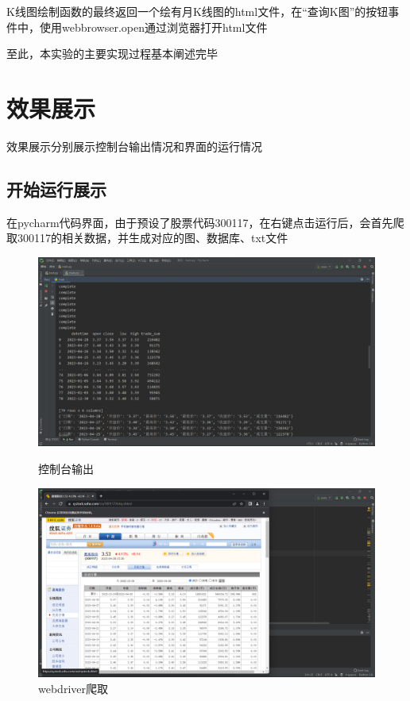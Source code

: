 \documentclass[UTF8,12pt]{article}
\begin{document}
K线图绘制函数的最终返回一个绘有月K线图的html文件，在“查询K图”的按钮事件中，使用webbrowser.open通过浏览器打开html文件

至此，本实验的主要实现过程基本阐述完毕

\section{效果展示}
效果展示分别展示控制台输出情况和界面的运行情况

\subsection{开始运行展示}
在pycharm代码界面，由于预设了股票代码300117，在右键点击运行后，会首先爬取300117的相关数据，并生成对应的图、数据库、txt文件

\begin{figure}[htbp]
	\centering
	\begin{minipage}{0.49\linewidth}
		\centering
		\includegraphics[width=0.9\linewidth]{img/9.png}
		\caption{控制台输出}
		\label{1}%
	\end{minipage}
	\begin{minipage}{0.49\linewidth}
		\centering
		\includegraphics[width=0.9\linewidth]{img/10.png}
		\caption{webdriver爬取}
		\label{2}%
	\end{minipage}
	\qquad
	

\end{figure}
\end{document}
